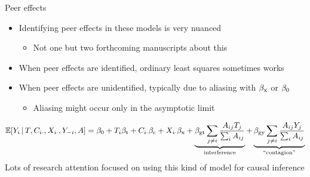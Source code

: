 \documentclass[aspectratio=169]{beamer}
\theoremstyle{remark}
\begin{document}
\appendix



\begin{frame}{Peer effects}
    \begin{itemize}
        \item Identifying peer effects in these models is very nuanced
              \begin{itemize}
                  \item Not one but two forthcoming manuscripts about this
              \end{itemize}
        \item When peer effects are identified, ordinary least squares sometimes works
        \item When peer effects are unidentified, typically due to aliasing with $\beta_\text{x}$ or $\beta_0$
              \begin{itemize}
                  \item Aliasing might occur only in the asymptotic limit
              \end{itemize}
    \end{itemize}
    \begin{equation*}
        \begin{aligned}
            \E[T, \C_{i \cdot}, \X_{i \cdot}, Y_{-i}, A]{Y_i}
            = \betazero + T_i \betat + \C_{i \cdot} \betac + \X_{i \cdot} \betax +
            \underbrace{\beta_\text{gt} \sum_{j \neq i} \frac{A_{ij} T_j}{\sum_i A_{ij}}}_\text{interference} +
            \underbrace{\beta_\text{gy} \sum_{j \neq i} \frac{A_{ij} Y_j}{\sum_i A_{ij}}}_\text{``contagion''}
        \end{aligned}
    \end{equation*}
    \vspace{2mm}
    Lots of research attention focused on using this kind of model for causal inference
\end{frame}
\end{document}
